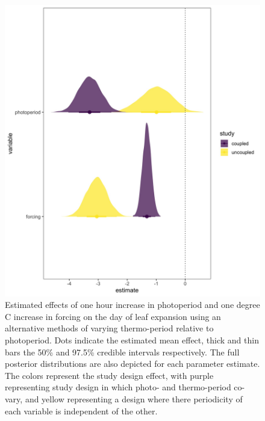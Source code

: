\documentclass[11pt]{article}
\begin{document}
\begin{figure}[h!]
    \centering
 \includegraphics[width=\textwidth]{..//Plots/periodicity_figures/modelcomps.jpeg}
    \caption{Estimated effects of one hour increase in photoperiod and one degree C increase in forcing on the day of leaf expansion using an alternative methods of varying thermo-period relative to photoperiod. Dots indicate the estimated mean effect, thick and thin bars the 50\%  and 97.5\% credible intervals respectively. The full posterior distributions are also depicted for each parameter estimate. The colors represent the study design effect, with purple representing study design in which photo- and thermo-period co-vary, and yellow representing a design where there periodicity of each variable is independent of the other.} 
    \label{fig:compy}
\end{figure}
\end{document}
